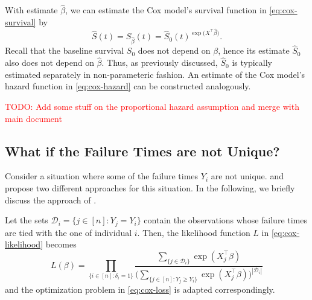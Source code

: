 \documentclass[11pt]{article}
\begin{document}
With estimate $\widehat{\beta}$, we can estimate the Cox model's survival function in \eqref{eq:cox-survival} by
\[
    \widehat{S}(t) = S_{\widehat{\beta}}(t)
    =
    \widehat{S}_0(t)^{\exp\big(X^\top \widehat{\beta}\big)}.
\]
Recall that the baseline survival $S_0$ does not depend on $\beta$, hence its estimate $\widehat{S}_0$ also does not depend on $\widehat{\beta}$. Thus, as previously discussed, $\widehat{S}_0$ is typically estimated separately in non-parameteric fashion. An estimate of the Cox model's hazard function in \eqref{eq:cox-hazard} can be constructed analogously.

\textcolor{red}{TODO: Add some stuff on the proportional hazard assumption and merge with main document}

\subsection{What if the Failure Times are not Unique?} \label{sec:non-unique-times}
Consider a situation where some of the failure times $Y_i$ are not unique. \cite{breslow1975} and \cite{efron1977} propose two different approaches for this situation. In the following, we briefly discuss the approach of \cite{breslow1975}.

Let the sets $\mathcal{D}_i = \{ j \in [n] : Y_j = Y_i \}$ contain the observations whose failure times are tied with the one of individual $i$. Then, the likelihood function $L$ in \eqref{eq:cox-likelihood} becomes
\begin{equation*} 
        L(\beta)
        =
        \prod_{\{ i \in [n] : \delta_i = 1 \}}
        \frac{ \sum_{\{j\in \mathcal{D}_i\}}\exp(X_j^\top \beta) }{ \Big( \sum_{\{ j\in[n] : Y_j \geq Y_i \}} \exp(X_j^\top \beta) \Big)^{|\mathcal{D}_i|} }
\end{equation*}
and the optimization problem in \eqref{eq:cox-loss} is adapted correspondingly.


\end{document}
